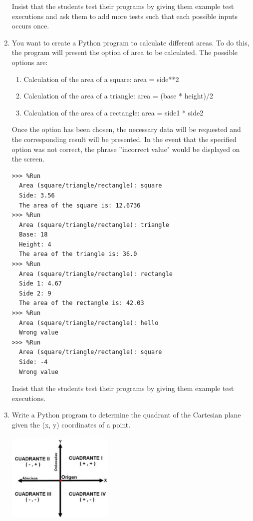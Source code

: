 \documentclass[
  fontsize=10pt,
  a4paper,
]{scrartcl}
\newenvironment{howTILEd}%
  {\begin{mdframed}[skipabove=10pt,skipbelow=10pt,backgroundcolor=pink!40]}%
  {\end{mdframed}}
\begin{document}
\begin{enumerate}
\begin{howTILEd}
Insist that the students test their programs by giving them example test executions and ask them to add more tests such that each possible inputs occurs once. 
\end{howTILEd}


\item You want to create a Python program to calculate different areas. To do this, the program will present the option of
area to be calculated. The possible options are:
\begin{enumerate}
\item Calculation of the area of a square: area = side**2
\item Calculation of the area of a triangle: area = (base * height)/2
\item Calculation of the area of a rectangle: area = side1 * side2
\end{enumerate}
Once the option has been chosen, the necessary data will be requested and the corresponding result will be presented.
In the event that the specified option was not
correct, the phrase ''incorrect value" would be displayed on the screen.

\begin{small}
\begin{Verbatim}[frame=single, label={\em examples of test executions}]
>>> %Run 
  Area (square/triangle/rectangle): square
  Side: 3.56
  The area of the square is: 12.6736
>>> %Run 
  Area (square/triangle/rectangle): triangle
  Base: 18
  Height: 4
  The area of the triangle is: 36.0
>>> %Run 
  Area (square/triangle/rectangle): rectangle
  Side 1: 4.67
  Side 2: 9
  The area of the rectangle is: 42.03
>>> %Run 
  Area (square/triangle/rectangle): hello
  Wrong value
>>> %Run 
  Area (square/triangle/rectangle): square
  Side: -4
  Wrong value
\end{Verbatim}
\end{small}

\begin{howTILEd}
Insist that the students test their programs by giving them example test executions. 
\end{howTILEd}



\item Write a Python program to determine the quadrant of the Cartesian plane given the (x, y) coordinates of a point.

\includegraphics[width=0.4\textwidth]{images/cuadrant.png}


\end{enumerate}
\end{document}
